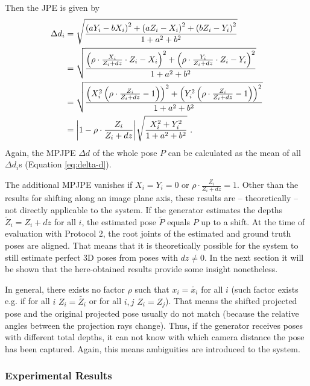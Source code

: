 Then the JPE  is given by 
\begin{align}
	\label{eq:z-shift-error}
	\Delta d_i &= \sqrt{\frac{\left (a Y_i - b X_i \right )^2 + \left (a Z_i - X_i \right )^2 + \left (b Z_i - Y_i \right )^2}{1 + a^2 + b^2}} \\ 
	&= \sqrt{\frac{\left (\rho \cdot \frac{X_i}{Z_i + dz}\cdot Z_i - X_i \right )^2 + \left (\rho \cdot \frac{Y_i }{Z_i + dz}\cdot Z_i- Y_i \right )^2}{1 + a^2 + b^2}} \\
	&= \sqrt{\frac{\left (X_i^2 \left (\rho \cdot \frac{Z_i}{Z_i + dz} - 1 \right) \right )^2 + \left (Y_i^2 \left (\rho \cdot \frac{Z_i}{Z_i + dz}-1 \right ) \right )^2}{1 + a^2 + b^2}} \\
	&= \abs{1 - \rho \cdot \frac{Z_i}{Z_i + dz}}  \sqrt{\frac{X_i^2 + Y_i^2}{1 + a^2 + b^2}}\ .
\end{align}
Again, the MPJPE $\Delta d$ of the whole pose $P$ can be calculated as the mean of all $\Delta d_i$s (Equation \eqref{eq:delta-d}).

The additional MPJPE vanishes if $X_i = Y_i = 0$ or $\rho \cdot \frac{Z_i}{Z_i + dz} = 1$.
Other than the results for shifting along an image plane axis, these results are -- theoretically -- not directly applicable to the system.
If the generator estimates the depths $\widetilde{Z}_i = Z_i + dz$ for all $i$, the estimated pose $\widetilde{P}$ equals $P$ up to a shift.
At the time of evaluation with Protocol 2, the root joints of the estimated and ground truth poses are aligned.
That means that it is theoretically possible for the system to still estimate perfect 3D poses from poses with $dz \neq 0$.
In the next section it will be shown that the here-obtained results provide some insight nonetheless.

In general, there exists no factor $\rho$ such that $x_i = \widetilde{x_i}$ for all $i$ (such factor exists e.g. if for all $i$ $Z_i = \widetilde{Z_i}$ or for all $i, j$ $Z_i = Z_j$).
That means the shifted projected pose and the original projected pose usually do not match (because the relative angles between the projection rays change).
Thus, if the generator receives poses with different total depths, it can not know with which camera distance the pose has been captured.
Again, this means ambiguities are introduced to the system.

\subsubsection{Experimental Results}
\label{sec:error-on-shift-experimental}

